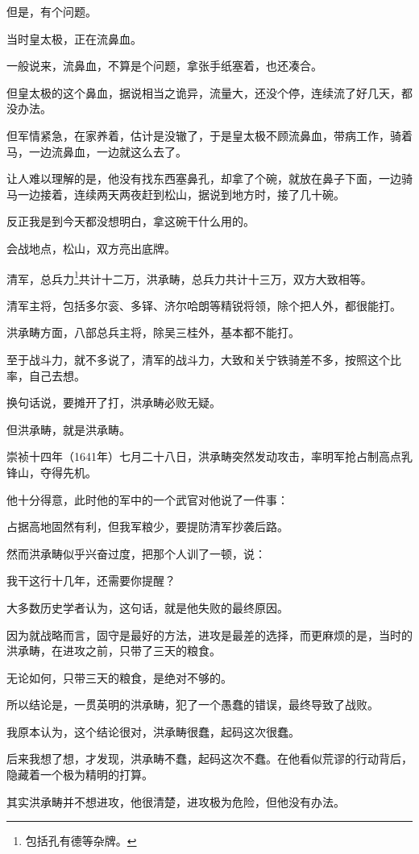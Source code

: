 \begin{multicols}{\theparacolNo}
但是，有个问题。

当时皇太极，正在流鼻血。

一般说来，流鼻血，不算是个问题，拿张手纸塞着，也还凑合。

但皇太极的这个鼻血，据说相当之诡异，流量大，还没个停，连续流了好几天，都没办法。

但军情紧急，在家养着，估计是没辙了，于是皇太极不顾流鼻血，带病工作，骑着马，一边流鼻血，一边就这么去了。

让人难以理解的是，他没有找东西塞鼻孔，却拿了个碗，就放在鼻子下面，一边骑马一边接着，连续两天两夜赶到松山，据说到地方时，接了几十碗。

反正我是到今天都没想明白，拿这碗干什么用的。

会战地点，松山，双方亮出底牌。

清军，总兵力\footnote{包括孔有德等杂牌。}共计十二万，洪承畴，总兵力共计十三万，双方大致相等。

清军主将，包括多尔衮、多铎、济尔哈朗等精锐将领，除个把人外，都很能打。

洪承畴方面，八部总兵主将，除吴三桂外，基本都不能打。

至于战斗力，就不多说了，清军的战斗力，大致和关宁铁骑差不多，按照这个比率，自己去想。

换句话说，要摊开了打，洪承畴必败无疑。

但洪承畴，就是洪承畴。

崇祯十四年（1641年）七月二十八日，洪承畴突然发动攻击，率明军抢占制高点乳锋山，夺得先机。

他十分得意，此时他的军中的一个武官对他说了一件事：

占据高地固然有利，但我军粮少，要提防清军抄袭后路。

然而洪承畴似乎兴奋过度，把那个人训了一顿，说：

我干这行十几年，还需要你提醒？

大多数历史学者认为，这句话，就是他失败的最终原因。

因为就战略而言，固守是最好的方法，进攻是最差的选择，而更麻烦的是，当时的洪承畴，在进攻之前，只带了三天的粮食。

无论如何，只带三天的粮食，是绝对不够的。

所以结论是，一贯英明的洪承畴，犯了一个愚蠢的错误，最终导致了战败。

我原本认为，这个结论很对，洪承畴很蠢，起码这次很蠢。

后来我想了想，才发现，洪承畴不蠢，起码这次不蠢。在他看似荒谬的行动背后，隐藏着一个极为精明的打算。

其实洪承畴并不想进攻，他很清楚，进攻极为危险，但他没有办法。


\end{multicols}
